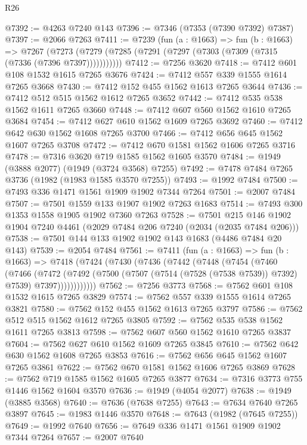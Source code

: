 \begin{lexlean}{R26}
\begin{coremodule}
@7392 := @4263 @7240 @143
@7396 := @7346 (@7353 (@7390 @7392) @7387)
@7397 := @2066 @7263
@7411 := @7239
    (fun (a : @1663) =>
    fun (b : @1663) =>
    @7267 (@7273 (@7279 (@7285 (@7291 (@7297 (@7303 (@7309 (@7315 (@7336 (@7396 @7397)))))))))))
@7412 := @7256 @3620
@7418 := @7412 @601 @108 @1532 @1615 @7265 @3676
@7424 := @7412 @557 @339 @1555 @1614 @7265 @3668
@7430 := @7412 @152 @455 @1562 @1613 @7265 @3644
@7436 := @7412 @512 @515 @1562 @1612 @7265 @3652
@7442 := @7412 @535 @538 @1562 @1611 @7265 @3660
@7448 := @7412 @607 @560 @1562 @1610 @7265 @3684
@7454 := @7412 @627 @610 @1562 @1609 @7265 @3692
@7460 := @7412 @642 @630 @1562 @1608 @7265 @3700
@7466 := @7412 @656 @645 @1562 @1607 @7265 @3708
@7472 := @7412 @670 @1581 @1562 @1606 @7265 @3716
@7478 := @7316 @3620 @719 @1585 @1562 @1605 @3570
@7484 := @1949 (@3888 @2077) (@1949 (@3724 @3568) @7255)
@7492 := @7478 @7484 @7265 @3736 (@1982 (@1983 @1585 @3570 @7255))
@7493 := @1992 @7484
@7500 := @7493 @336 @1471 @1561 @1909 @1902 @7344 @7264
@7501 := @2007 @7484
@7507 := @7501 @1559 @133 @1907 @1902 @7263 @1683
@7514 := @7493 @300 @1353 @1558 @1905 @1902 @7360 @7263
@7528 := @7501 @215 @146 @1902 @1904 @7240 @4461 (@2029 @7484 @206 @7240 (@2034 (@2035 @7484 @206)))
@7538 := @7501 @144 @133 @1902 @1902 @143 @1683 (@4486 @7484 @20 @143)
@7539 := @2054 @7484
@7561 := @7411
    (fun (a : @1663) =>
    fun (b : @1663) =>
    @7418
      (@7424
        (@7430
          (@7436
            (@7442
              (@7448
                (@7454
                  (@7460
                    (@7466
                      (@7472
                        (@7492
                          (@7500 (@7507 (@7514 (@7528 (@7538 @7539)) @7392) @7539) @7397))))))))))))
@7562 := @7256 @3773
@7568 := @7562 @601 @108 @1532 @1615 @7265 @3829
@7574 := @7562 @557 @339 @1555 @1614 @7265 @3821
@7580 := @7562 @152 @455 @1562 @1613 @7265 @3797
@7586 := @7562 @512 @515 @1562 @1612 @7265 @3805
@7592 := @7562 @535 @538 @1562 @1611 @7265 @3813
@7598 := @7562 @607 @560 @1562 @1610 @7265 @3837
@7604 := @7562 @627 @610 @1562 @1609 @7265 @3845
@7610 := @7562 @642 @630 @1562 @1608 @7265 @3853
@7616 := @7562 @656 @645 @1562 @1607 @7265 @3861
@7622 := @7562 @670 @1581 @1562 @1606 @7265 @3869
@7628 := @7562 @719 @1585 @1562 @1605 @7265 @3877
@7634 := @7316 @3773 @755 @1446 @1562 @1604 @3570
@7636 := @1949 (@4054 @2077)
@7638 := @1949 (@3885 @3568)
@7640 := @7636 (@7638 @7255)
@7643 := @7634 @7640 @7265 @3897
@7645 := @1983 @1446 @3570
@7648 := @7643 (@1982 (@7645 @7255))
@7649 := @1992 @7640
@7656 := @7649 @336 @1471 @1561 @1909 @1902 @7344 @7264
@7657 := @2007 @7640

\end{coremodule}
\end{lexlean}
